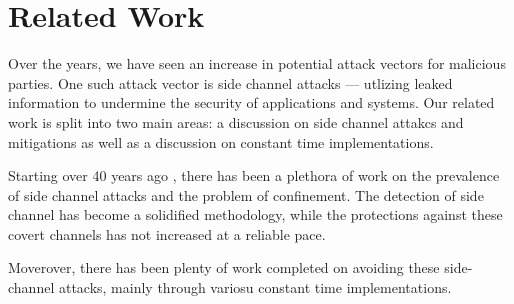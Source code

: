 \section{Related Work}
\label{sec:related}


Over the years, we have seen an increase in potential attack vectors for
malicious parties. One such attack vector is side channel attacks --- utlizing
leaked information to undermine the security of applications and systems.
Our related work is split into two main areas: a discussion on side channel
attakcs and mitigations as well as a discussion on constant time
implementations.

Starting over 40 years ago \cite{lampson1973, wray1991, lipner1975}, there has
been a plethora of work on the prevalence of side channel attacks and the
problem of confinement. The detection of side channel has become a solidified
methodology, while the protections against these covert channels has not increased
at a reliable pace\cite{kemmerer2002}.

Moverover, there has been plenty of work completed on avoiding these
side-channel attacks, mainly through variosu constant time implementations.

\cite{ocaml}
